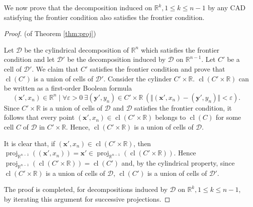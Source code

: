 \documentclass[
]{book}
\theoremstyle{definition}
\theoremstyle{definition}
\theoremstyle{definition}
\theoremstyle{definition}
\theoremstyle{remark}
\begin{document}
We now prove that the decomposition induced on \(\mathbb{R}^k, 1 \le k \le n-1\) by any CAD satisfying the frontier condition also satisfies the frontier condition.

\begin{proof}
(of Theorem \ref{thm:proj})

Let \(\mathcal{D}\) be the cylindrical decomposition of \(\mathbb{R}^n\) which satisfies the frontier condition and let \(\mathcal{D}'\) be the decomposition induced by \(\mathcal{D}\) on \(\mathbb{R}^{n-1}\).
Let \(C'\) be a cell of \(\mathcal{D}'\). We claim that \(C'\) satisfies the frontier condition and prove that \({\operatorname{cl} \left( C' \right)}\) is a union of cells of \(\mathcal{D'}\).
Consider the cylinder \(C' \times \mathbb{R}\).
\({\operatorname{cl} \left( C' \times \mathbb{R} \right)}\) can be written as a first-order Boolean formula
\begin{equation}
(\mathbf{x'},x_n) \in \mathbb{R}^n \mid \forall \varepsilon > 0\> \exists (\mathbf{y'},y_n) \in C' \times \mathbb{R}\> (\Vert (\mathbf{x'},x_n) - (\mathbf{y'},y_n) \Vert < \varepsilon ).
\label{eq:closure-quantifiers}
\end{equation}
Since \(C' \times \mathbb{R}\) is a union of cells of \(\mathcal{D}\) and \(\mathcal{D}\) satisfies the frontier condition,
it follows that every point \((\mathbf{x'},x_n) \in {\operatorname{cl} \left( C' \times \mathbb{R} \right)}\) belongs to \({\operatorname{cl} \left( C \right)}\) for some cell \(C\) of \(\mathcal{D}\) in \(C' \times \mathbb{R}\). Hence, \({\operatorname{cl} \left( C' \times \mathbb{R} \right)}\) is a union of cells of \(\mathcal{D}\).

It is clear that, if \((\mathbf{x'}, x_n) \in {\operatorname{cl} \left( C' \times \mathbb{R} \right)}\), then \(\operatorname{proj}_{\mathbb{R}^{n-1}}((\mathbf{x'}, x_n)) = \mathbf{x'} \in \operatorname{proj}_{\mathbb{R}^{n-1}}({\operatorname{cl} \left( C' \times \mathbb{R} \right)})\). Hence \(\operatorname{proj}_{\mathbb{R}^{n-1}}({\operatorname{cl} \left( C' \times \mathbb{R} \right)}) = {\operatorname{cl} \left( C' \right)}\) and, by the cylindrical property, since \({\operatorname{cl} \left( C' \times \mathbb{R} \right)}\) is a union of cells of \(\mathcal{D}\), \({\operatorname{cl} \left( C' \right)}\) is a union of cells of \(\mathcal{D'}\).

The proof is completed, for decompositions induced by \(\mathcal{D}\) on \(\mathbb{R}^k, 1 \le k \le n-1\), by iterating this argument for successive projections.
\end{proof}
\end{document}
